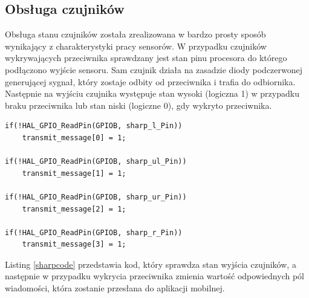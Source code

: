 \subsection{Obsługa czujników}
Obsługa stanu czujników została zrealizowana w bardzo prosty sposób wynikający z charakterystyki pracy sensorów. W przypadku czujników wykrywających przeciwnika sprawdzany jest stan pinu procesora do którego podłączono wyjście sensoru. Sam czujnik działa na zasadzie diody podczerwonej generującej sygnał, który zostaje odbity od przeciwnika i trafia do odbiornika. Następnie na wyjściu czujnika występuje stan wysoki (logiczna 1) w przypadku braku przeciwnika lub stan niski (logiczne 0), gdy wykryto przeciwnika.

\begin{minipage}{\textwidth}
	\begin{lstlisting}[label=sharpcode,caption=Obsługa czujników przeciwnika.]
if(!HAL_GPIO_ReadPin(GPIOB, sharp_l_Pin))
	transmit_message[0] = 1;

if(!HAL_GPIO_ReadPin(GPIOB, sharp_ul_Pin))
	transmit_message[1] = 1;

if(!HAL_GPIO_ReadPin(GPIOB, sharp_ur_Pin))
	transmit_message[2] = 1;

if(!HAL_GPIO_ReadPin(GPIOB, sharp_r_Pin))
	transmit_message[3] = 1;
	\end{lstlisting}
\end{minipage}

Listing \ref{sharpcode} przedstawia kod, który sprawdza stan wyjścia czujników, a następnie w przypadku wykrycia przeciwnika zmienia wartość odpowiednych pól wiadomości, która zostanie przesłana do aplikacji mobilnej. 